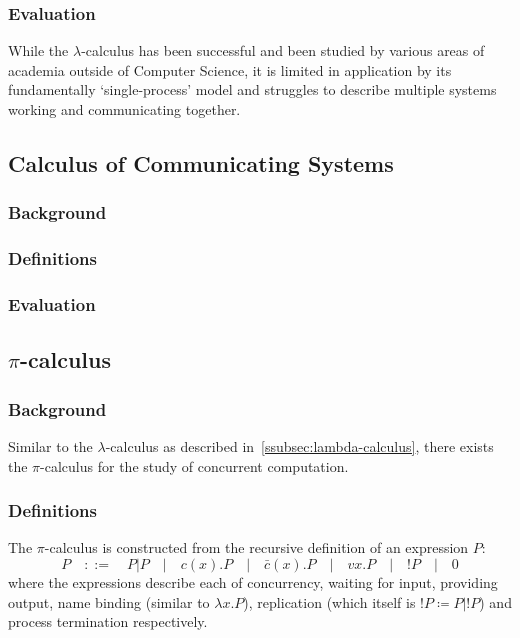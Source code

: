 \documentclass{article}
\begin{document}
        
        \subsubsection{Evaluation}
            While the $\lambda$-calculus has been successful and been studied by various areas of academia outside of Computer Science, it is limited in application by its fundamentally `single-process' model and struggles to describe multiple systems working and communicating together.



    \subsection{Calculus of Communicating Systems}

        \subsubsection{Background}
            \cite{pi-calculus-in-ccs}


        \subsubsection{Definitions}


        \subsubsection{Evaluation}



    \subsection{$\pi$-calculus}

        \subsubsection{Background}
            \cite{pi-calculus}
            Similar to the $\lambda$-calculus as described in~\ref{ssubsec:lambda-calculus}, there exists the $\pi$-calculus for the study of concurrent computation.
    

        \subsubsection{Definitions}
            The $\pi$-calculus is constructed from the recursive definition of  an expression $P$:
            \begin{equation*}
                    P  \quad::=\quad  P|P  \quad|\quad  c(x).P  \quad|\quad  \bar{c}(x).P  \quad|\quad  vx.P  \quad|\quad  !P  \quad|\quad  0
            \end{equation*}
            where the expressions describe each of concurrency, waiting for input, providing output, name binding (similar to $\lambda x . P$), replication (which itself is $!P \coloneq P|!P$) and process termination respectively.
\end{document}
